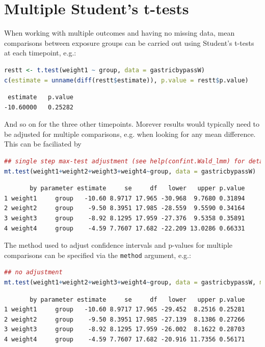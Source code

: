 \documentclass[12pt]{article}
\begin{document}
\clearpage
\section{Multiple Student's t-tests}
\label{sec:org2022d84}

When working with multiple outcomes and having no missing data, mean
comparisons between exposure groups can be carried out using Student's
t-tests at each timepoint, e.g.:
\begin{lstlisting}[language=r,numbers=none]
restt <- t.test(weight1 ~ group, data = gastricbypassW)
c(estimate = unname(diff(restt$estimate)), p.value = restt$p.value)
\end{lstlisting}

\label{}
\begin{verbatim}
 estimate   p.value 
-10.60000   0.25282
\end{verbatim}


And so on for the three other timepoints. Morever results would
typically need to be adjusted for multiple comparisons, e.g. when
looking for any mean difference. This can be faciliated by
\begin{lstlisting}[language=r,numbers=none]
## single step max-test adjustment (see help(confint.Wald_lmm) for details)
mt.test(weight1+weight2+weight3+weight4~group, data = gastricbypassW)
\end{lstlisting}

\label{}
\begin{verbatim}
       by parameter estimate     se     df   lower   upper p.value
1 weight1     group   -10.60 8.9717 17.965 -30.968  9.7680 0.31894
2 weight2     group    -9.50 8.3951 17.985 -28.559  9.5590 0.34164
3 weight3     group    -8.92 8.1295 17.959 -27.376  9.5358 0.35891
4 weight4     group    -4.59 7.7607 17.682 -22.209 13.0286 0.66331
\end{verbatim}


The method used to adjust confidence intervals and p-values for
multiple comparisons can be specified via the \texttt{method} argument, e.g.:
\begin{lstlisting}[language=r,numbers=none]
## no adjustment
mt.test(weight1+weight2+weight3+weight4~group, data = gastricbypassW, method = "none")
\end{lstlisting}

\label{}
\begin{verbatim}
       by parameter estimate     se     df   lower   upper p.value
1 weight1     group   -10.60 8.9717 17.965 -29.452  8.2516 0.25281
2 weight2     group    -9.50 8.3951 17.985 -27.139  8.1386 0.27266
3 weight3     group    -8.92 8.1295 17.959 -26.002  8.1622 0.28703
4 weight4     group    -4.59 7.7607 17.682 -20.916 11.7356 0.56171
\end{verbatim}
\end{document}
